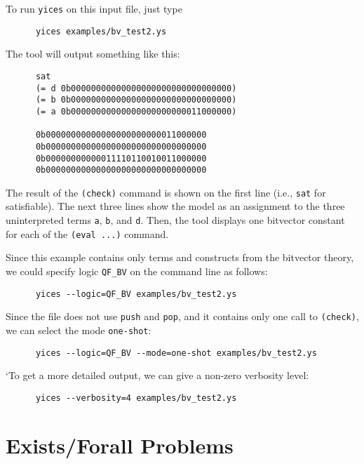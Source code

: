\documentclass[11pt,twoside,fleqn,openright,titlepage]{cslreport}
\begin{document}
\medskip\noindent
To run \texttt{yices} on this input file, just type
\begin{small}
\begin{verbatim}
      yices examples/bv_test2.ys
\end{verbatim}
\end{small}
The tool will output something like this:
\begin{small}
\begin{verbatim}
      sat
      (= d 0b00000000000000000000000000000000)
      (= b 0b00000000000000000000000000000000)
      (= a 0b00000000000000000000000011000000)

      0b00000000000000000000000011000000
      0b00000000000000000000000000000000
      0b00000000000011110110010011000000
      0b00000000000000000000000000000000
\end{verbatim}
\end{small}
The result of the \texttt{(check)}  command is shown on the first line
(i.e., \texttt{sat}  for satisfiable). The  next three lines  show the
model as  an assignment to  the three uninterpreted  terms \texttt{a},
\texttt{b},  and \texttt{d}.  Then,  the tool  displays one  bitvector
constant for each of the \texttt{(eval ...)} command.

\medskip\noindent
Since  this  example  contains  only  terms and  constructs  from  the
bitvector  theory,  we  could  specify logic  \texttt{QF\_BV}  on  the
command line as follows:
\begin{small}
\begin{verbatim}
      yices --logic=QF_BV examples/bv_test2.ys
\end{verbatim}
\end{small}
Since the file does not use \texttt{push} and \texttt{pop}, and it
contains only one call to \texttt{(check)}, we can select the mode
\texttt{one-shot}:
\begin{small}
\begin{verbatim}
      yices --logic=QF_BV --mode=one-shot examples/bv_test2.ys
\end{verbatim}
\end{small}
`To get a more detailed output, we can give a non-zero verbosity level:
\begin{small}
\begin{verbatim}
      yices --verbosity=4 examples/bv_test2.ys
\end{verbatim}
\end{small}

\section{Exists/Forall Problems}
\end{document}
